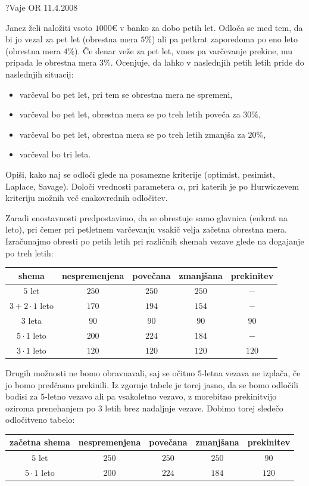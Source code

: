 \begin{naloga}{?}{Vaje OR 11.4.2008}
\begin{vprasanje}[vezava]
Janez želi naložiti vsoto $1000 €$ v banko za dobo petih let.
Odloča se med tem, da bi jo vezal za pet let (obrestna mera $5\%$)
ali pa petkrat zaporedoma po eno leto (obrestna mera $4\%$).
Če denar veže za pet let, vmes pa varčevanje prekine,
mu pripada le obrestna mera $3\%$.
Ocenjuje, da lahko v naslednjih petih letih pride do naslednjih situacij:
\begin{itemize}
\item varčeval bo pet let, pri tem se obrestna mera ne spremeni,
\item varčeval bo pet let, obrestna mera se po treh letih poveča za $30\%$,
\item varčeval bo pet let, obrestna mera se po treh letih zmanjša za $20\%$,
\item varčeval bo tri leta.
\end{itemize}
Opiši, kako naj se odloči glede na posamezne kriterije
(optimist, pesimist, Laplace, Savage).
Določi vrednosti parametera $\alpha$,
pri katerih je po Hurwiczevem kriteriju možnih več enakovrednih odločitev.
\end{vprasanje}

\begin{odgovor}
Zaradi enostavnosti predpostavimo,
da se obrestuje samo glavnica (enkrat na leto),
pri čemer pri petletnem varčevanju vsakič velja začetna obrestna mera.
Izračunajmo obresti po petih letih pri različnih shemah vezave
glede na dogajanje po treh letih:
\begin{center}
\begin{tabular}{c|cccc}
shema & nespremenjena & povečana & zmanjšana & prekinitev \\ \hline
$5$ let              & $250$ & $250$ & $250$ &   $-$ \\
$3 + 2 \cdot 1$ leto & $170$ & $194$ & $154$ &   $-$ \\
$3$ leta             &  $90$ &  $90$ &  $90$ &  $90$ \\ \hline
$5 \cdot 1$ leto     & $200$ & $224$ & $184$ &   $-$ \\
$3 \cdot 1$ leto     & $120$ & $120$ & $120$ & $120$ \\
\end{tabular}
\end{center}
Drugih možnosti ne bomo obravnavali,
saj se očitno $5$-letna vezava ne izplača, če jo bomo predčasno prekinili.
Iz zgornje tabele je torej jasno,
da se bomo odločili bodisi za $5$-letno vezavo ali pa vsakoletno vezavo,
z morebitno prekinitvijo oziroma prenehanjem po $3$ letih
brez nadaljnje vezave.
Dobimo torej sledečo odločitveno tabelo:
\begin{center}
\begin{tabular}{c|cccc}
začetna shema & nespremenjena & povečana & zmanjšana & prekinitev \\ \hline
$5$ let          & $250$ & $250$ & $250$ &  $90$ \\
$5 \cdot 1$ leto & $200$ & $224$ & $184$ & $120$ \\
\end{tabular}
\end{center}


\end{odgovor}
\end{naloga}
